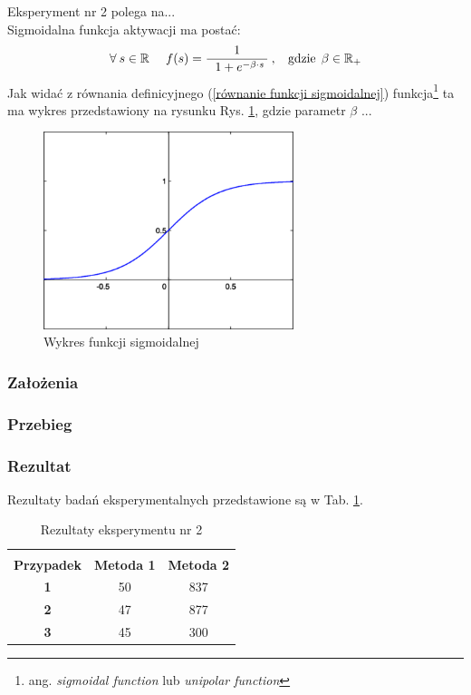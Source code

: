 \documentclass[12pt]{article}
\begin{document}
Eksperyment nr 2 polega na...\\
Sigmoidalna funkcja aktywacji ma postać:
\begin{equation}
 \forall\: s \in \mathbb{R}\:\:\:\:\:\: f(s) = \frac{1}{\:\:\:1 + e^{-\beta \cdot s}\:}\:,
 \:\:\:\:\textnormal{gdzie}\:\:\beta \in \mathbb{R}_{+}
 \label{równanie funkcji sigmoidalnej}
\end{equation}
Jak widać z równania definicyjnego (\ref{równanie funkcji sigmoidalnej}) 
funkcja\footnote{ang. \textit{sigmoidal function} lub \textit{unipolar function}}
ta ma wykres przedstawiony 
na rysunku Rys. \ref{funkcja sigmoidalna}, gdzie parametr $\beta$ ...
\begin{figure}[h!]
 \centering
 \includegraphics[width=7.3cm]{funkcja.png}
 \vspace{-0.1cm}
 \caption{Wykres funkcji sigmoidalnej}
 \label{funkcja sigmoidalna}
\end{figure}

\subsubsection{Założenia}

\subsubsection{Przebieg}

\subsubsection{Rezultat}

Rezultaty badań eksperymentalnych przedstawione są w Tab. \ref{wyniki eksperymentu drugiego}.
\vspace{-0.5cm}
\begin{table}[h!]
 \caption{Rezultaty eksperymentu nr 2}
 \centering
 \vspace{0.2cm}
 \begin{tabular}{c c c }
  \hline\hline\\[-0.4cm]
  \textbf{Przypadek} & \textbf{Metoda 1} & \textbf{Metoda 2}\\[0.1cm]
  \hline
  \textbf{1} & 50 & 837 \\
  \textbf{2} & 47 & 877 \\
  \textbf{3} & 45 & 300 \\ [0.1cm]
  \hline
 \end{tabular}
 \label{wyniki eksperymentu drugiego}
\end{table}
\end{document}
